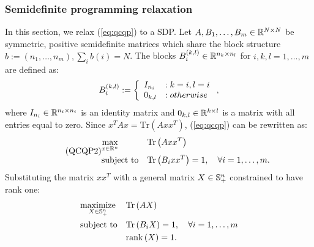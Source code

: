 \subsubsection{Semidefinite programming relaxation}\label{subsubsec:sdp}
In this section, we relax  (\ref{eq:qcqp}) to a SDP.
Let $A, B_1, \ldots, B_m  \in \mathbb{R}^{N \times N}$ be symmetric, positive semidefinite matrices which share the block structure $b := \left(n_1, \ldots, n_m\right), \sum_i b\left(i\right) = N$.
The blocks $B_i^{(k,l)} \in \mathbb{R}^{n_k \times n_l}$ for $i,k,l = 1,\ldots,m$ are defined as:
$$
B_i^{(k,l)} := \left\{
     \begin{array}{l l}
       I_{n_i} & : k = i, l = i\\
       0_{k,l} & : otherwise
     \end{array}
   \right.,
$$
where $I_{n_i} \in \mathbb{R}^{n_i \times n_i}$ is an identity matrix and $0_{k,l} \in \mathbb{R}^{k \times l}$ is a matrix with all entries equal to zero.
Since $x^T A x = \mathrm{Tr}\left( A x x^T\right)$, (\ref{eq:qcqp})
can be rewritten as:
%
\begin{equation}\label{eq:qcqp2}
\tag{QCQP2}
\begin{aligned}
& \underset{x \in \mathbb{R}^n}{\text{max}}
& &\mathrm{Tr}\left(A x x^T\right) \\
& \text{subject to}
& &\mathrm{Tr}\left(B_i x x^T\right) = 1,  \quad\forall i =1,\ldots,m.\\
\end{aligned}
\end{equation}
%
%
Substituting the matrix $x x^T$ with a general matrix $X \in \mathbb{S}_{+}^{n}$ constrained to have rank one:
%
\begin{equation*}
\begin{aligned}
& \underset{X \in \mathbb{S}_{+}^n}{\text{maximize}}
& &\mathrm{Tr}\left(A X\right) \\
& \text{subject to}
& &\mathrm{Tr}\left(B_i X\right) = 1,  \quad\forall i =1,\ldots,m\\
& & &\mathrm{rank}\left(X\right) = 1.
\end{aligned}
\end{equation*}
%
%
%
%

